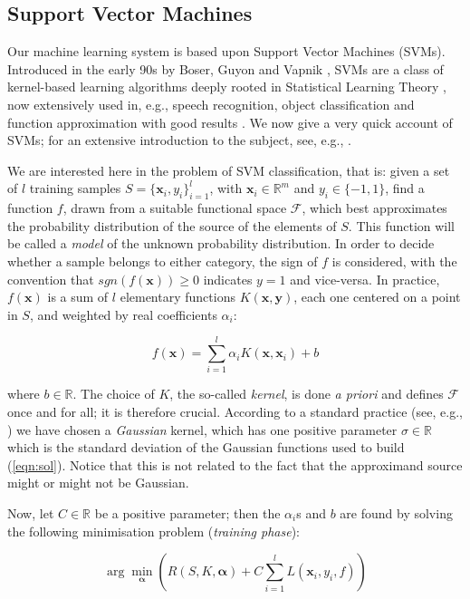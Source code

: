 \documentclass[a4paper,10pt,conference]{ieeeconf}
\def\RR{\mathbb{R}}
\def\xx{\mathbf{x}}
\def\yy{\mathbf{y}}
\def\aa{\boldsymbol{\alpha}}
\begin{document}
\subsection{Support Vector Machines}
\label{subsec:svm}

Our machine learning system is based upon Support Vector Machines
(SVMs). Introduced in the early 90s by Boser, Guyon and Vapnik
\cite{BGV92}, SVMs are a class of kernel-based learning algorithms
deeply rooted in Statistical Learning Theory \cite{v-edbed-82}, now
extensively used in, e.g., speech recognition, object classification
and function approximation with good results \cite{Cristianini00}. We
now give a very quick account of SVMs; for an extensive introduction
to the subject, see, e.g., \cite{SmolaTut2004}.

We are interested here in the problem of SVM classification, that is:
given a set of $l$ training samples $S=\{\xx_i,y_i\}_{i=1}^l$, with
$\xx_i \in \RR^m$ and $y_i \in \{-1,1\}$, find a function $f$, drawn
from a suitable functional space $\mathcal{F}$, which best
approximates the probability distribution of the source of the
elements of $S$. This function will be called a \emph{model} of the
unknown probability distribution. In order to decide whether a sample
belongs to either category, the sign of $f$ is considered, with the
convention that $sgn(f(\xx)) \geq 0$ indicates $y = 1$ and
vice-versa. In practice, $f(\xx)$ is a sum of $l$ elementary functions
$K(\xx,\yy)$, each one centered on a point in $S$, and weighted by
real coefficients $\alpha_i$:

\begin{equation} \label{eqn:sol}
  f(\xx) = \sum_{i=1}^l \alpha_i K(\xx,\xx_i) + b
\end{equation}

\noindent where $b \in \RR$. The choice of $K$, the so-called
\emph{kernel}, is done \emph{a priori} and defines $\mathcal{F}$ once
and for all; it is therefore crucial. According to a standard practice
(see, e.g., \cite{Cristianini00}) we have chosen a \emph{Gaussian}
kernel, which has one positive parameter $\sigma \in \RR$ which is the
standard deviation of the Gaussian functions used to build
(\ref{eqn:sol}). Notice that this is not related to the fact that the
approximand source might or might not be Gaussian.

Now, let $C \in \RR$ be a positive parameter; then the $\alpha_i$s and
$b$ are found by solving the following minimisation problem
(\emph{training phase}):

\begin{equation} \label{eqn:svm_primal}
  \arg \min_{\aa} \left( R(S,K,\aa) + C \sum_{i=1}^l L(\xx_i,y_i,f) \right)
\end{equation}
\end{document}
